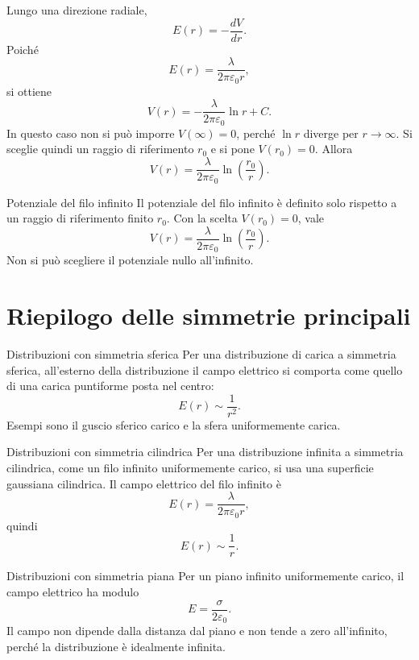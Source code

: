 \documentclass[a4paper]{article}
\begin{document}
Lungo una direzione radiale,
\[
    E(r)=-\frac{dV}{dr}.
\]
Poiché
\[
    E(r)=\frac{\lambda}{2\pi\varepsilon_0r},
\]
si ottiene
\[
    V(r)=-\frac{\lambda}{2\pi\varepsilon_0}\ln r+C.
\]
In questo caso non si può imporre \(V(\infty)=0\), perché \(\ln r\) diverge per \(r\to\infty\). Si sceglie quindi un raggio di riferimento \(r_0\) e si pone \(V(r_0)=0\). Allora
\[
    V(r)=\frac{\lambda}{2\pi\varepsilon_0}\ln\left(\frac{r_0}{r}\right).
\]

\begin{snippetproposition}{Potenziale del filo infinito}
    Il potenziale del filo infinito è definito solo rispetto a un raggio di riferimento finito \(r_0\). Con la scelta \(V(r_0)=0\), vale
    \[
        V(r)=\frac{\lambda}{2\pi\varepsilon_0}\ln\left(\frac{r_0}{r}\right).
    \]
    Non si può scegliere il potenziale nullo all'infinito.
\end{snippetproposition}

\section{Riepilogo delle simmetrie principali}

\begin{snippetproposition}{Distribuzioni con simmetria sferica}
    Per una distribuzione di carica a simmetria sferica, all'esterno della distribuzione il campo elettrico si comporta come quello di una carica puntiforme posta nel centro:
    \[
        E(r)\sim \frac{1}{r^2}.
    \]
    Esempi sono il guscio sferico carico e la sfera uniformemente carica.
\end{snippetproposition}

\begin{snippetproposition}{Distribuzioni con simmetria cilindrica}
    Per una distribuzione infinita a simmetria cilindrica, come un filo infinito uniformemente carico, si usa una superficie gaussiana cilindrica. Il campo elettrico del filo infinito è
    \[
        E(r)=\frac{\lambda}{2\pi\varepsilon_0r},
    \]
    quindi
    \[
        E(r)\sim \frac{1}{r}.
    \]
\end{snippetproposition}

\begin{snippetproposition}{Distribuzioni con simmetria piana}
    Per un piano infinito uniformemente carico, il campo elettrico ha modulo
    \[
        E=\frac{\sigma}{2\varepsilon_0}.
    \]
    Il campo non dipende dalla distanza dal piano e non tende a zero all'infinito, perché la distribuzione è idealmente infinita.
\end{snippetproposition}
\end{document}
